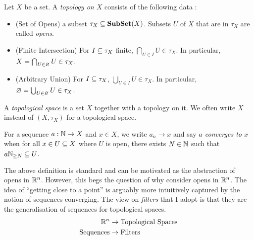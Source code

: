 \documentclass[main.tex]{subfiles}
\begin{document}
\begin{dfn}
  
  Let $X$ be a set.
  A \emph{topology on $X$} consists of the following data : 
  \begin{itemize}
    \item (Set of Opens) a subset $\tau_X \subseteq \mathbf{Sub}\mathbf{Set}(X)$.
    Subsets $U$ of $X$ that are in $\tau_X$ are called \emph{opens}.
    \item (Finite Intersection) 
    For $I \subseteq \tau_X$ finite, $\bigcap_{U \in I} U \in \tau_X$.
    In particular, $X = \bigcap_{U \in \varnothing} U \in \tau_X$.
    \item (Arbitrary Union)
    For $I \subseteq \tau_X$, $\bigcup_{U \in I} U \in \tau_X$.
    In particular, $\varnothing = \bigcup_{U \in \varnothing} U \in \tau_X$.
  \end{itemize}
  A \emph{topological space} is 
  a set $X$ together with a topology on it.
  We often write $X$ instead of $(X,\tau_X)$ for a topological space. 

  For a sequence $a : \mathbb{N} \to X$ and $x \in X$,
  we write $a_n \to x$ and say \emph{$a$ converges to $x$} when 
  for all $x \in U \subseteq X$ where $U$ is open, 
  there exists $N \in \mathbb{N}$ such that $a \mathbb{N}_{\geq N} \subseteq U$.
\end{dfn}

\begin{rmk}
  
  The above definition is standard and can be motivated as
  the abstraction of opens in $\mathbb{R}^n$. 
  However, this begs the question of why consider opens in $\mathbb{R}^n$. 
  The idea of ``getting close to a point'' is arguably 
  more intuitively captured by the notion of sequences converging. 
  The view on \emph{filters} that I adopt is that 
  they are the generalisation of sequences for topological spaces. 
  \begin{align*}
    \text{$\mathbb{R}^n$} &\to \text{Topological Spaces} \\
    \text{Sequences} &\to \text{Filters}
  \end{align*}
\end{rmk}
\end{document}
